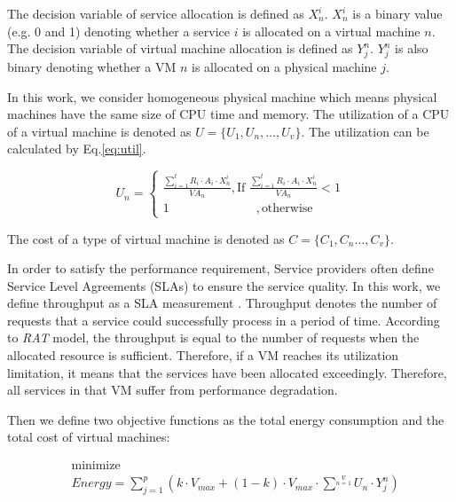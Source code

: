 The decision variable of service allocation is defined as $X^i_n$. $X^i_n$
is a binary value (e.g. 0 and 1) denoting whether a
service $i$ is allocated on a virtual machine $n$.
The decision variable of virtual machine allocation is defined as $Y^n_j$. $Y^n_j$
is also binary denoting whether a
VM $n$ is allocated on a physical machine $j$.


 In this work, we consider homogeneous physical machine which means physical machines have the same size of CPU time and memory. 
 The utilization of a CPU of a virtual machine is denoted as $U = \{U_1, U_n, \dots, U_v\}$. 
 The utilization can be calculated by Eq.\ref{eq:util}.

\begin{equation}
\label{eq:util}
  U_n =
  \begin{cases} 
    \frac{\sum_{i = 1}^t R_i \cdot A_i \cdot X^i_n}{VA_n}, \text{If }  \frac{\sum_{i = 1}^t R_i \cdot A_i \cdot X^i_n}{VA_n} < 1 \\
    1   \quad\quad\quad\quad\quad\quad\quad ,\text{otherwise}
  \end{cases}
\end{equation}

The cost of a type of virtual machine is denoted as $C = \{C_1, C_n \dots, C_v\}$. 



In order to satisfy the performance requirement, Service providers often define Service Level Agreements (SLAs) to ensure the service quality. In this work, we define throughput as a SLA measurement \cite{SLA_metric}. 
Throughput denotes the number of requests that a service could successfully process in a period of time. According to \textit{RAT} model, the throughput is equal to the number of requests when the allocated resource is sufficient. 
Therefore, if a VM reaches its utilization limitation, it means that the services have been allocated exceedingly.
Therefore, all services in that VM suffer from 
performance degradation.


Then we define two objective functions as the total energy consumption and the total cost of virtual machines:

\begin{equation}
\label{eq:energy}
\begin{aligned}
& {\text{minimize}}\\
& Energy = \sum\limits_{j=1}^p (k \cdot V_{max} + (1 - k) \cdot V_{max} \cdot \sum^v\limits_{n=1} U_n \cdot Y^n_j)\\
\end{aligned}
\end{equation}

